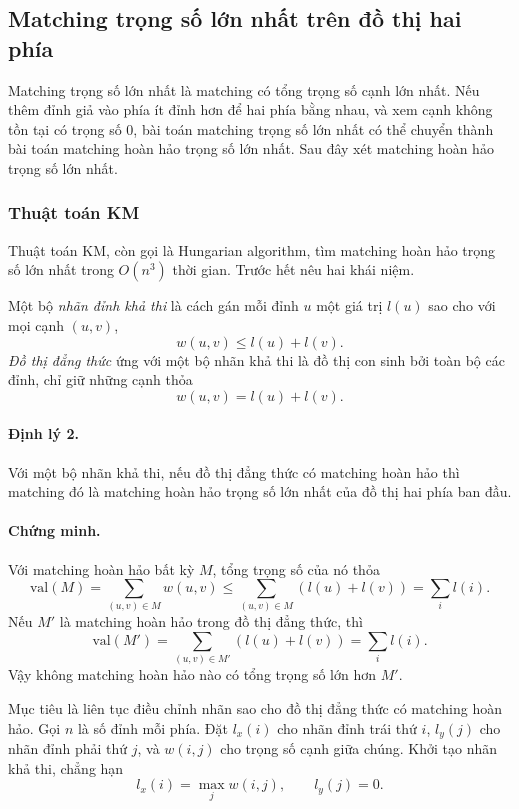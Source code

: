 \documentclass[11pt]{article}
\begin{document}
\subsection{Matching trọng số lớn nhất trên đồ thị hai phía}

Matching trọng số lớn nhất là matching có tổng trọng số cạnh lớn nhất. Nếu thêm
đỉnh giả vào phía ít đỉnh hơn để hai phía bằng nhau, và xem cạnh không tồn tại
có trọng số \(0\), bài toán matching trọng số lớn nhất có thể chuyển thành bài
toán matching hoàn hảo trọng số lớn nhất. Sau đây xét matching hoàn hảo trọng số
lớn nhất.

\subsubsection{Thuật toán KM}

Thuật toán KM, còn gọi là Hungarian algorithm, tìm matching hoàn hảo trọng số
lớn nhất trong \(O(n^3)\) thời gian. Trước hết nêu hai khái niệm.

Một bộ \emph{nhãn đỉnh khả thi} là cách gán mỗi đỉnh \(u\) một giá trị \(l(u)\)
sao cho với mọi cạnh \((u,v)\),
\[
  w(u,v)\le l(u)+l(v).
\]
\emph{Đồ thị đẳng thức} ứng với một bộ nhãn khả thi là đồ thị con sinh bởi toàn
bộ các đỉnh, chỉ giữ những cạnh thỏa
\[
  w(u,v)=l(u)+l(v).
\]

\paragraph{Định lý 2.}
Với một bộ nhãn khả thi, nếu đồ thị đẳng thức có matching hoàn hảo thì matching
đó là matching hoàn hảo trọng số lớn nhất của đồ thị hai phía ban đầu.

\paragraph{Chứng minh.}
Với matching hoàn hảo bất kỳ \(M\), tổng trọng số của nó thỏa
\[
  \mathrm{val}(M)=\sum_{(u,v)\in M}w(u,v)
  \le \sum_{(u,v)\in M}(l(u)+l(v))=\sum_i l(i).
\]
Nếu \(M'\) là matching hoàn hảo trong đồ thị đẳng thức, thì
\[
  \mathrm{val}(M')=\sum_{(u,v)\in M'}(l(u)+l(v))=\sum_i l(i).
\]
Vậy không matching hoàn hảo nào có tổng trọng số lớn hơn \(M'\).

Mục tiêu là liên tục điều chỉnh nhãn sao cho đồ thị đẳng thức có matching hoàn
hảo. Gọi \(n\) là số đỉnh mỗi phía. Đặt \(l_x(i)\) cho nhãn đỉnh trái thứ
\(i\), \(l_y(j)\) cho nhãn đỉnh phải thứ \(j\), và \(w(i,j)\) cho trọng số cạnh
giữa chúng. Khởi tạo nhãn khả thi, chẳng hạn
\[
  l_x(i)=\max_j w(i,j),\qquad l_y(j)=0.
\]
\end{document}
